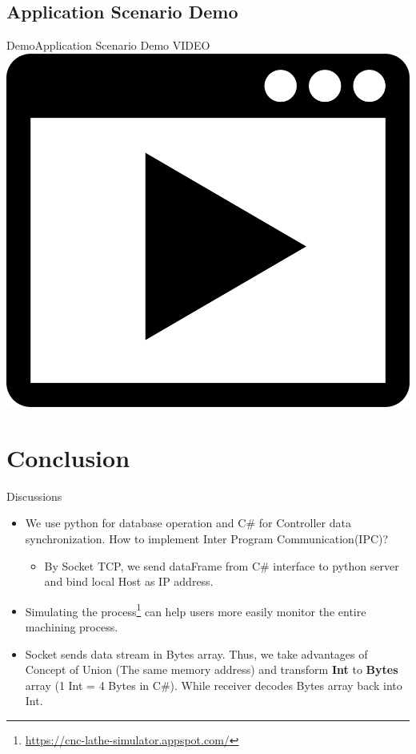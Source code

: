 \documentclass[11pt]{beamer}
\begin{document}
\subsection{Application Scenario Demo}
\begin{frame}{Demo}{Application Scenario Demo}
  \centering
  \Huge{VIDEO}
  \includegraphics[scale=0.025]{228-2283562_png-file-video-icon-vector-png.png}
\end{frame}


\section{Conclusion}
\begin{frame}{Discussions}
  \begin{itemize}
    \item We use python for database operation and C\# for Controller data synchronization. How to implement Inter Program Communication(IPC)?
    \begin{itemize}
      \item By Socket TCP, we send dataFrame from C\# interface to python server and bind local Host as IP address. 
    \end{itemize}
    \item Simulating the process\footnote{\tiny{\url{https://cnc-lathe-simulator.appspot.com/}}} can help users more easily monitor the entire machining process.
    \item Socket sends data stream in Bytes array. Thus, we take advantages of Concept of Union (The same memory address) and transform \textbf{Int} to \textbf{Bytes} array (1 Int = 4 Bytes in C\#). While  receiver decodes Bytes array back into Int.
  \end{itemize}
\end{frame}
\end{document}
